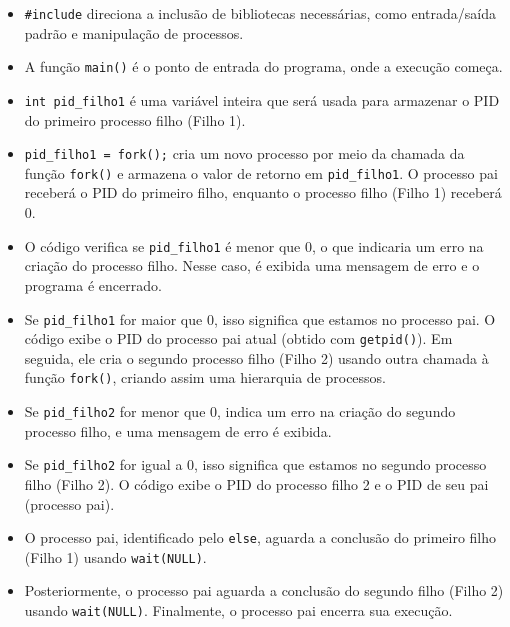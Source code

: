 \documentclass[
	12pt,				%
	openright,			%
	oneside,			%
	a4paper,			%
	chapter=TITLE,		%
	english,			%
	french,				%
	spanish,			%
	brazil				%
	]{abntex2}
\theoremstyle{definition}
\begin{document}
\begin{itemize}
    \item \texttt{\#include} direciona a inclusão de bibliotecas necessárias, como entrada/saída padrão e manipulação de processos.
    \item A função \texttt{main()} é o ponto de entrada do programa, onde a execução começa.
    \item \texttt{int pid\_filho1} é uma variável inteira que será usada para armazenar o PID do primeiro processo filho (Filho 1).
    \item \texttt{pid\_filho1 = fork();} cria um novo processo por meio da chamada da função \texttt{fork()} e armazena o valor de retorno em \texttt{pid\_filho1}. O processo pai receberá o PID do primeiro filho, enquanto o processo filho (Filho 1) receberá 0.
    \item O código verifica se \texttt{pid\_filho1} é menor que 0, o que indicaria um erro na criação do processo filho. Nesse caso, é exibida uma mensagem de erro e o programa é encerrado.
    \item Se \texttt{pid\_filho1} for maior que 0, isso significa que estamos no processo pai. O código exibe o PID do processo pai atual (obtido com \texttt{getpid()}). Em seguida, ele cria o segundo processo filho (Filho 2) usando outra chamada à função \texttt{fork()}, criando assim uma hierarquia de processos. 
    \item Se \texttt{pid\_filho2} for menor que 0, indica um erro na criação do segundo processo filho, e uma mensagem de erro é exibida.
    \item Se \texttt{pid\_filho2} for igual a 0, isso significa que estamos no segundo processo filho (Filho 2). O código exibe o PID do processo filho 2 e o PID de seu pai (processo pai). 
    \item O processo pai, identificado pelo \texttt{else}, aguarda a conclusão do primeiro filho (Filho 1) usando \texttt{wait(NULL)}.
    \item Posteriormente, o processo pai aguarda a conclusão do segundo filho (Filho 2) usando \texttt{wait(NULL)}. Finalmente, o processo pai encerra sua execução.

\end{itemize}
\end{document}
